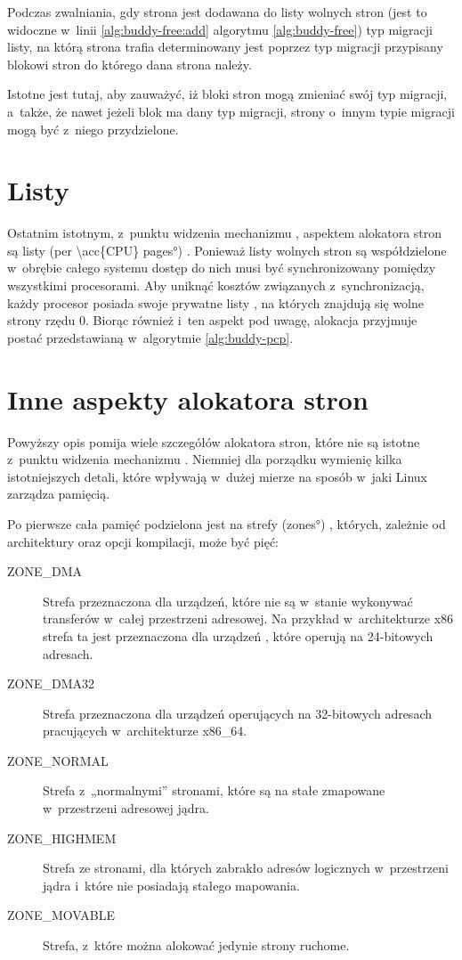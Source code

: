 Podczas zwalniania, gdy strona jest dodawana do listy wolnych stron
(jest to widoczne w~linii \ref{alg:buddy-free:add} algorytmu
\ref{alg:buddy-free}) typ migracji listy, na którą strona trafia
determinowany jest poprzez typ migracji przypisany blokowi stron do
którego dana strona należy.

Istotne jest tutaj, aby zauważyć, iż bloki stron mogą zmieniać swój
typ migracji, a~także, że nawet jeżeli blok ma dany typ migracji,
strony o~innym typie migracji mogą być z~niego przydzielone.


\section{Listy }\label{sec:pcp-lists}

Ostatnim istotnym, z~punktu widzenia mechanizmu , aspektem
alokatora stron są listy  (\ang{per \acc{CPU} pages})
\autocite[podrozdział 8.1.8]{bib:utlk}.  Ponieważ listy wolnych stron
są współdzielone w~obrębie całego systemu dostęp do nich musi być
synchronizowany pomiędzy wszystkimi procesorami.  Aby uniknąć kosztów
związanych z~synchronizacją, każdy procesor posiada swoje prywatne
listy , na których znajdują się wolne strony rzędu 0.  Biorąc
również i~ten aspekt pod uwagę, alokacja przyjmuje postać
przedstawianą w~algorytmie \ref{alg:buddy-pcp}.

\section{Inne aspekty alokatora stron}

Powyższy opis pomija wiele szczegółów alokatora stron, które nie są
istotne z~punktu widzenia mechanizmu .  Niemniej dla porządku
wymienię kilka istotniejszych detali, które wpływają w~dużej mierze na
sposób w~jaki Linux zarządza pamięcią.

Po pierwsze cała pamięć podzielona jest na strefy (\ang{zones})
\autocite[podrozdział 8.1.3]{bib:utlk}, których, zależnie od
architektury oraz opcji kompilacji, może być pięć:

\begin{description}
\item[ZONE\_DMA] Strefa przeznaczona dla urządzeń, które nie są
  w~stanie wykonywać transferów  w~całej przestrzeni
  adresowej.  Na przykład w~architekturze x86 strefa ta jest
  przeznaczona dla urządzeń , które operują na 24-bitowych
  adresach.
\item[ZONE\_DMA32] Strefa przeznaczona dla urządzeń operujących
  na 32-bitowych adresach pracujących w~architekturze x86\_64.
\item[ZONE\_NORMAL] Strefa z~„normalnymi” stronami, które są na
  stałe zmapowane w~przestrzeni adresowej jądra.
\item[ZONE\_HIGHMEM] Strefa ze stronami, dla których zabrakło
  adresów logicznych w~przestrzeni jądra i~które nie posiadają stałego
  mapowania.
\item[ZONE\_MOVABLE] Strefa, z~które można alokować jedynie
  strony ruchome.
\end{description}

